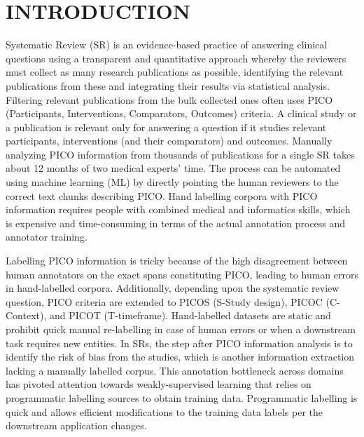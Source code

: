 \documentclass[10.7pt,]{article}
\begin{document}
\section{INTRODUCTION}\label{introduction}
%
Systematic Review (SR) is an evidence-based practice of answering clinical questions using a transparent and quantitative approach whereby the reviewers must collect as many research publications as possible, identifying the relevant publications from these and integrating their results via statistical analysis.
Filtering relevant publications from the bulk collected ones often uses PICO (Participants, Interventions, Comparators, Outcomes) criteria. 
A clinical study or a publication is relevant only for answering a question if it studies relevant participants, interventions (and their comparators) and outcomes. 
Manually analyzing PICO information from thousands of publications for a single SR takes about 12 months of two medical experts' time.
The process can be automated using machine learning (ML) by directly pointing the human reviewers to the correct text chunks describing PICO.
Hand labelling corpora with PICO information requires people with combined medical and informatics skills, which is expensive and time-consuming in terms of the actual annotation process and annotator training.


Labelling PICO information is tricky because of the high disagreement between human annotators on the exact spans constituting PICO, leading to human errors in hand-labelled corpora.
Additionally, depending upon the systematic review question, PICO criteria are extended to PICOS (S-Study design), PICOC (C-Context), and PICOT (T-timeframe).
Hand-labelled datasets are static and prohibit quick manual re-labelling in case of human errors or when a downstream task requires new entities.
In SRs, the step after PICO information analysis is to identify the risk of bias from the studies, which is another information extraction lacking a manually labelled corpus. 
This annotation bottleneck across domains has pivoted attention towards weakly-supervised learning that relies on programmatic labelling sources to obtain training data.
Programmatic labelling is quick and allows efficient modifications to the training data labels per the downstream application changes.
\end{document}
